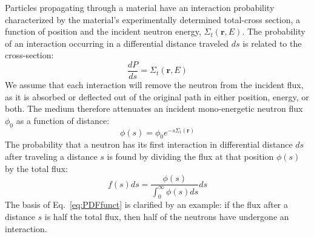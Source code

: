 Particles propagating through a material have an interaction
probability characterized by the material's experimentally determined
total-cross section, a function of position and the incident neutron
energy, $\Sigma_t(\mathbf{r}, E)$. The probability of an interaction
occurring in a differential distance traveled $ds$ is related to the
 cross-section:
\begin{equation}
  \label{eq:macroscopic}
  \frac{dP}{ds} = \Sigma_t(\mathbf{r}, E)
\end{equation}
We assume that each interaction will remove the neutron from the
incident flux, as it is absorbed or deflected out of the original path
in either position, energy, or both.  The medium therefore attenuates
an incident mono-energetic neutron flux $\phi_0$ as a function of
distance:
\begin{equation}
  \label{eq:attenuation}
  \phi(s) = \phi_0 e^{-s\Sigma_t(\mathbf{r})}
\end{equation}
The probability that a neutron has its first interaction in
differential distance $ds$ after
traveling a distance $s$ is found by dividing the flux at that
position $\phi(s)$ by the total flux:
\begin{equation}
  \label{eq:PDFfunct}
  f(s)ds = \frac{\phi(s)}{\int_0^\infty\phi(s)ds}ds
\end{equation}
The basis of Eq.~\eqref{eq:PDFfunct} is clarified by an example: if
the flux after a distance $s$ is half the total flux, then half of the
neutrons have undergone an interaction.

